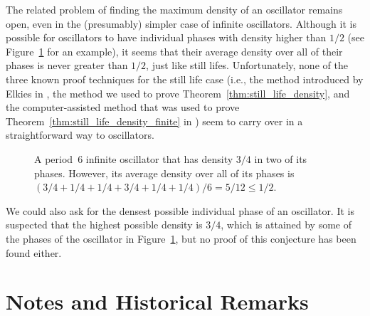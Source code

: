 The related problem of finding the maximum density of an oscillator remains open, even in the (presumably) simpler case of infinite oscillators. Although it is possible for oscillators to have individual phases with density higher than $1/2$ (see Figure~\ref{fig:dense_oscillator} for an example), it seems that their average density over all of their phases is never greater than $1/2$, just like still lifes. Unfortunately, none of the three known proof techniques for the still life case (i.e., the method introduced by Elkies in \cite{Elk98}, the method we used to prove Theorem~\ref{thm:still_life_density}, and the computer-assisted method that was used to prove Theorem~\ref{thm:still_life_density_finite} in \cite{CS12}) seem to carry over in a straightforward way to oscillators.

\begin{figure}[!htb]
	\centering
	\caption{A period~$6$ infinite oscillator that has density $3/4$ in two of its phases. However, its average density over all of its phases is $(3/4 + 1/4 + 1/4 + 3/4 + 1/4 + 1/4)/6 = 5/12 \leq 1/2$.}\label{fig:dense_oscillator}
\end{figure}

We could also ask for the densest possible individual phase of an oscillator. It is suspected that the highest possible density is $3/4$, which is attained by some of the phases of the oscillator in Figure~\ref{fig:dense_oscillator}, but no proof of this conjecture has been found either.


\section{Notes and Historical Remarks}\label{sec:still_lifes_notes}

